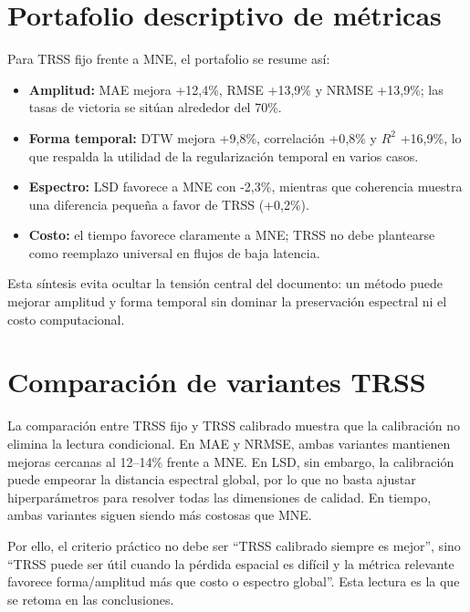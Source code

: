 \section{Portafolio descriptivo de métricas}

Para TRSS fijo frente a MNE, el portafolio se resume así:

\begin{itemize}[leftmargin=*,itemsep=2pt,topsep=3pt]
\item \textbf{Amplitud:} MAE mejora +12{,}4\%, RMSE +13{,}9\% y NRMSE +13{,}9\%; las tasas de victoria se sitúan alrededor del 70\%.
\item \textbf{Forma temporal:} DTW mejora +9{,}8\%, correlación +0{,}8\% y $R^2$ +16{,}9\%, lo que respalda la utilidad de la regularización temporal en varios casos.
\item \textbf{Espectro:} LSD favorece a MNE con -2{,}3\%, mientras que coherencia muestra una diferencia pequeña a favor de TRSS (+0{,}2\%).
\item \textbf{Costo:} el tiempo favorece claramente a MNE; TRSS no debe plantearse como reemplazo universal en flujos de baja latencia.
\end{itemize}

Esta síntesis evita ocultar la tensión central del documento: un método puede mejorar amplitud y forma temporal sin dominar la preservación espectral ni el costo computacional.

\section{Comparación de variantes TRSS}

La comparación entre TRSS fijo y TRSS calibrado muestra que la calibración no elimina la lectura condicional. En MAE y NRMSE, ambas variantes mantienen mejoras cercanas al 12--14\% frente a MNE. En LSD, sin embargo, la calibración puede empeorar la distancia espectral global, por lo que no basta ajustar hiperparámetros para resolver todas las dimensiones de calidad. En tiempo, ambas variantes siguen siendo más costosas que MNE.

Por ello, el criterio práctico no debe ser “TRSS calibrado siempre es mejor”, sino “TRSS puede ser útil cuando la pérdida espacial es difícil y la métrica relevante favorece forma/amplitud más que costo o espectro global”. Esta lectura es la que se retoma en las conclusiones.
